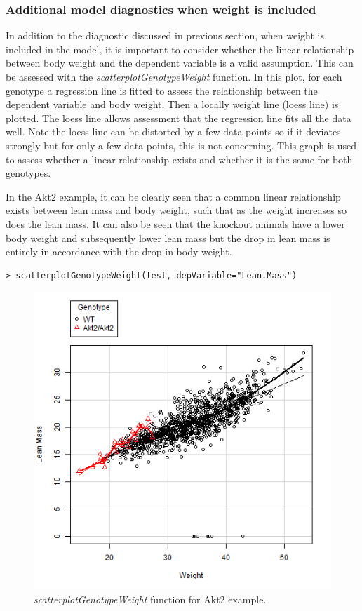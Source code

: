 \documentclass[12pt,a4paper]{article}
\begin{document}
\subsubsection{Additional model diagnostics when weight is included}
In addition to the diagnostic discussed in previous section, when weight is included in the model, it is important to consider whether the linear relationship between body weight and the dependent variable is a valid assumption. 
This can be assessed with the \textit{scatterplotGenotypeWeight} function. 
In this plot, for each genotype a regression line is fitted to assess the relationship between the dependent variable and body weight. 
Then a locally weight line (loess line) is plotted. 
The loess line allows assessment that the regression line fits all the data well.
Note the loess line can be distorted by a few data points so if it deviates strongly but for only a few data points, this is not concerning.  
This graph is used to assess whether a linear relationship exists and whether it is the same for both genotypes.  

In the Akt2 example, it can be clearly seen that a common linear relationship exists between lean mass and body weight, such that as the weight increases so does the lean mass. 
It can also be seen that the knockout animals have a lower body weight and subsequently lower lean mass but the drop in lean mass is entirely in accordance with the drop in body weight. 

\begingroup
    \fontsize{8pt}{12pt}\selectfont
\begin{verbatim}
> scatterplotGenotypeWeight(test, depVariable="Lean.Mass")
\end{verbatim}
\endgroup 

\begin{figure}[H]%
\centerline{\includegraphics[scale=0.5]{cs1_scatterplotGenotypeWeight.png}}
\caption{\textit{scatterplotGenotypeWeight} function for Akt2 example.}\label{fig:22}
\end{figure}
\end{document}
